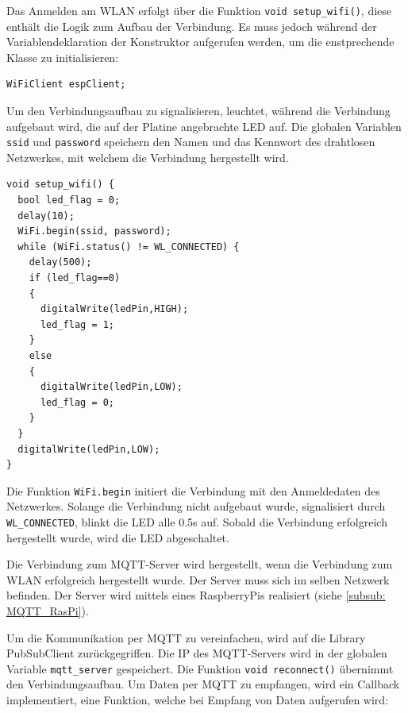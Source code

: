 \smallskip

Das Anmelden am \acs{WLAN} erfolgt über die
Funktion \lstinline!void setup_wifi()!, diese enthält die Logik zum Aufbau der Verbindung. Es muss jedoch während der Variablendeklaration der
Konstruktor aufgerufen werden, um die enstprechende Klasse zu initialisieren:
\begin{lstlisting}[caption={\textit{Konstrukor WLAN-Library}}]
  WiFiClient espClient;
\end{lstlisting}


\smallskip

Um den Verbindungsaufbau zu signalisieren, leuchtet, während die Verbindung aufgebaut wird, die auf der Platine angebrachte LED auf. 
Die globalen Variablen \lstinline!ssid! und \lstinline!password! speichern den Namen und das Kennwort des drahtlosen Netzwerkes, 
mit welchem die Verbindung hergestellt wird.
\begin{lstlisting}[caption={\textit{Anmelden an \acs{WLAN}}}]
  void setup_wifi() {
  bool led_flag = 0;
  delay(10);
  WiFi.begin(ssid, password);
  while (WiFi.status() != WL_CONNECTED) {
    delay(500);
    if (led_flag==0)
    {
      digitalWrite(ledPin,HIGH);
      led_flag = 1;
    }
    else
    {
      digitalWrite(ledPin,LOW);
      led_flag = 0;
    }
  }
  digitalWrite(ledPin,LOW);
}
\end{lstlisting}

Die Funktion \lstinline!WiFi.begin! initiert die Verbindung mit den Anmeldedaten des Netzwerkes. Solange die Verbindung nicht aufgebaut wurde, signalisiert
durch \lstinline!WL_CONNECTED!, blinkt die LED alle 0.5s auf. Sobald die Verbindung erfolgreich hergestellt wurde, wird die LED abgeschaltet.

\newpage

Die Verbindung zum \acs{MQTT}-Server wird hergestellt,
wenn die Verbindung zum \ac{WLAN} erfolgreich hergestellt wurde. Der Server muss sich im selben Netzwerk befinden. Der Server wird mittels eines
RaspberryPis realisiert (siehe \ref{subsub: MQTT_RasPi}). 

\smallskip

Um die Kommunikation per \ac{MQTT} zu vereinfachen, wird auf die Library PubSubClient \citep{PubSub} zurückgegriffen. Die IP des \ac{MQTT}-Servers
wird in der globalen Variable \lstinline!mqtt_server! gespeichert. Die Funktion \lstinline!void reconnect()! übernimmt den Verbindungsaufbau.
Um Daten per \ac{MQTT} zu empfangen, wird ein Callback implementiert, eine Funktion, welche bei Empfang von Daten aufgerufen wird:


